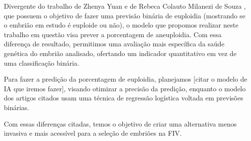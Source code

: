 Divergente do trabalho de Zhenya Yuan \cite{yuan2023} e de Rebeca Colauto Milanezi de Souza \cite{souzarebeca2022}, que possuem o objetivo de fazer uma previsão binária de euploidia (mostrando se o embrião em estudo é euploide ou não), o modelo que propomos realizar neste trabalho em questão visa prever a porcentagem de aneuploidia. Com essa diferença de resultado, permitimos uma avaliação mais específica da saúde genética do embrião analisado, ofertando um indicador quantitativo em vez de uma classificação binária.

Para fazer a predição da porcentagem de euploidia, planejamos [citar o modelo de IA que iremos fazer], visando otimizar a precisão da predição, enquanto o modelo dos artigos citados usam uma técnica de regressão logística voltada em previsões binárias.

Com essas diferenças citadas, temos o objetivo de criar uma alternativa menos invasiva e mais acessível para a seleção de embriões na FIV.
